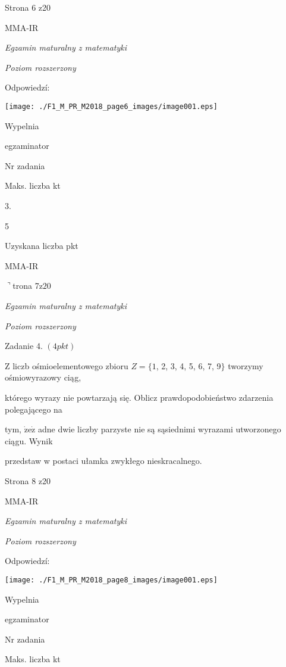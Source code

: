 \documentclass[a4paper,12pt]{article}
\begin{document}
Strona 6 z20

MMA-IR





{\it Egzamin maturalny z matematyki}

{\it Poziom rozszerzony}

Odpowiedzí:
\begin{center}
\texttt{[image: ./F1\_M\_PR\_M2018\_page6\_images/image001.eps]}
\end{center}
Wypelnia

egzaminator

Nr zadania

Maks. liczba kt

3.

5

Uzyskana liczba pkt

MMA-IR

$\urcorner$trona 7$\mathrm{z}20$





{\it Egzamin maturalny z matematyki}

{\it Poziom rozszerzony}

Zadanie 4. $(4pkt)$

$\mathrm{Z}$ liczb ośmioelementowego zbioru $Z=\{1$, 2, 3, 4, 5, 6, 7, 9$\}$ tworzymy ośmiowyrazowy ciąg,

którego wyrazy nie powtarzają się. Oblicz prawdopodobieństwo zdarzenia polegającego na

tym, $\dot{\mathrm{z}}\mathrm{e}\dot{\mathrm{z}}$ adne dwie liczby parzyste nie są sąsiednimi wyrazami utworzonego ciągu. Wynik

przedstaw w postaci ułamka zwykłego nieskracalnego.

Strona 8 z20

MMA-IR





{\it Egzamin maturalny z matematyki}

{\it Poziom rozszerzony}

Odpowiedzí:
\begin{center}
\texttt{[image: ./F1\_M\_PR\_M2018\_page8\_images/image001.eps]}
\end{center}
Wypelnia

egzaminator

Nr zadania

Maks. liczba kt
\end{document}

